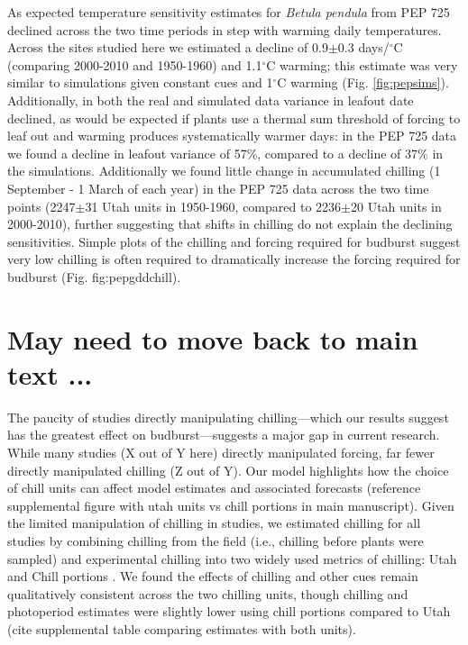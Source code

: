 \documentclass{article}
\begin{document}
\par As expected temperature sensitivity estimates for \emph{Betula pendula} from PEP 725 declined across the two time periods in step with warming daily temperatures. Across the sites studied here we estimated a decline of 0.9$\pm$0.3 days/$^{\circ}$C (comparing 2000-2010 and 1950-1960) and 1.1$^{\circ}$C warming; this estimate was very similar to simulations given constant cues and 1$^{\circ}$C warming (Fig. \ref{fig:pepsims}). Additionally, in both the real and simulated data variance in leafout date declined, as would be expected if plants use a thermal sum threshold of forcing to leaf out and warming produces systematically warmer days: in the PEP 725 data we found a decline in leafout variance of 57\%, compared to a decline of 37\% in the simulations. Additionally we found little change in accumulated chilling (1 September - 1 March of each year) in the PEP 725 data across the two time points (2247$\pm$31 Utah units in 1950-1960, compared to 2236$\pm$20 Utah units in 2000-2010), further suggesting that shifts in chilling do not explain the declining sensitivities. Simple plots of the chilling and forcing required for budburst suggest very low chilling is often required to dramatically increase the forcing required for budburst (Fig. {fig:pepgddchill}).


\section*{May need to move back to main text ...}

\par The paucity of studies directly manipulating chilling---which our results suggest has the greatest effect on budburst---suggests a major gap in current research. While many studies (X out of Y here) directly manipulated forcing, far fewer directly manipulated chilling (Z out of Y). 
Our model highlights how the choice of chill units can affect model estimates and associated forecasts (reference supplemental figure with utah units vs chill portions in main manuscript). 
Given the limited manipulation of chilling in studies, we estimated chilling for all studies by combining chilling from the field (i.e., chilling before plants were sampled) and experimental chilling into two widely used metrics of chilling: Utah and Chill portions \citep{dennis2003}. We found the effects of chilling and other cues remain qualitatively consistent across the two chilling units, though chilling and photoperiod estimates were slightly lower using chill portions compared to Utah (cite supplemental table comparing estimates with both units).  
\end{document}
